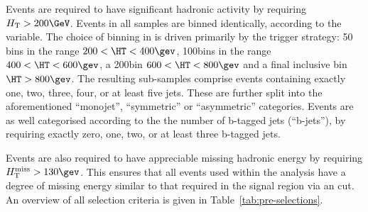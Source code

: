 Events are required to have significant hadronic activity by requiring $\scalht > 200\GeV$.  Events in all samples are binned identically, according to the \HT variable. The choice of binning in \HT is driven primarily by the trigger strategy: 50\gev
bins in the range $200 < \HT < 400\gev$, 100\gev bins in the range $400 < \HT < 600\gev$, a 200\gev bin $600<\HT<800\gev$ and a final 
inclusive bin $\HT > 800\gev$. The resulting sub-samples comprise events containing exactly one, two, three, four, or at least five jets. These are further split into the aforementioned  ``monojet'',  ``symmetric'' or ``asymmetric'' \njet categories. Events are as well categorised according to the the number of b-tagged jets (``b-jets''), by requiring exactly zero, one, two, or at least three b-tagged jets. 


Events are also required to have appreciable missing hadronic energy by requiring $\mht>130\gev$. This ensures that all events used within the analysis have a degree of missing energy similar to that required in the signal region via an \alphat cut. An overview of all selection criteria is given in Table~\ref{tab:pre-selections}.

